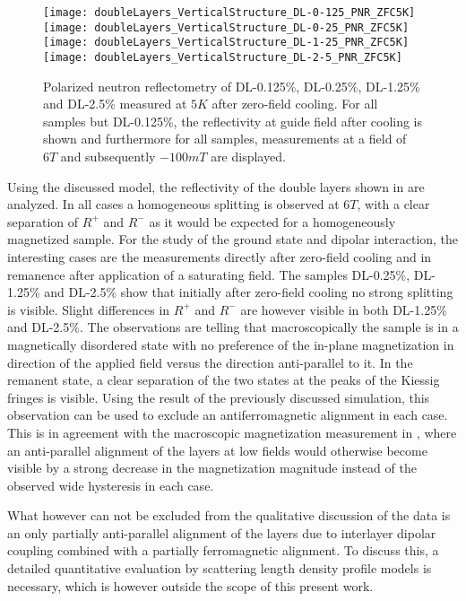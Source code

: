 \documentclass[\main/dresen_thesis.tex]{subfiles}
\begin{document}
  \begin{figure}[tb]
    \centering
    \texttt{[image: doubleLayers\_VerticalStructure\_DL-0-125\_PNR\_ZFC5K]}
    \texttt{[image: doubleLayers\_VerticalStructure\_DL-0-25\_PNR\_ZFC5K]}
    \texttt{[image: doubleLayers\_VerticalStructure\_DL-1-25\_PNR\_ZFC5K]}
    \texttt{[image: doubleLayers\_VerticalStructure\_DL-2-5\_PNR\_ZFC5K]}
    \caption{\label{fig:doubleLayers:pnrData}Polarized neutron reflectometry of DL-0.125\%, DL-0.25\%, DL-1.25\% and DL-2.5\% measured at $5 \unit{K}$ after zero-field cooling. For all samples but DL-0.125\%, the reflectivity at guide field after cooling is shown and furthermore for all samples, measurements at a field of $6 \unit{T}$ and subsequently $-100 \unit{mT}$ are displayed.}
  \end{figure}
  Using the discussed model, the reflectivity of the double layers shown in  are analyzed.
  In all cases a homogeneous splitting is observed at $6 \unit{T}$, with a clear separation of $R^{+}$ and $R^{-}$ as it would be expected for a homogeneously magnetized sample.
  For the study of the ground state and dipolar interaction, the interesting cases are the measurements directly after zero-field cooling and in remanence after application of a saturating field.
  The samples DL-0.25\%, DL-1.25\% and DL-2.5\% show that initially after zero-field cooling no strong splitting is visible.
  Slight differences in $R^{+}$ and $R^{-}$ are however visible in both DL-1.25\% and DL-2.5\%.
  The observations are telling that macroscopically the sample is in a magnetically disordered state with no preference of the in-plane magnetization in direction of the applied field versus the direction anti-parallel to it.
  In the remanent state, a clear separation of the two states at the peaks of the Kiessig fringes is visible.
  Using the result of the previously discussed simulation, this observation can be used to exclude an antiferromagnetic alignment in each case.
  This is in agreement with the macroscopic magnetization measurement in , where an anti-parallel alignment of the layers at low fields would otherwise become visible by a strong decrease in the magnetization magnitude instead of the observed wide hysteresis in each case.

  What however can not be excluded from the qualitative discussion of the data is an only partially anti-parallel alignment of the layers due to interlayer dipolar coupling combined with a partially ferromagnetic alignment.
  To discuss this, a detailed quantitative evaluation by scattering length density profile models is necessary, which is however outside the scope of this present work.
\end{document}
